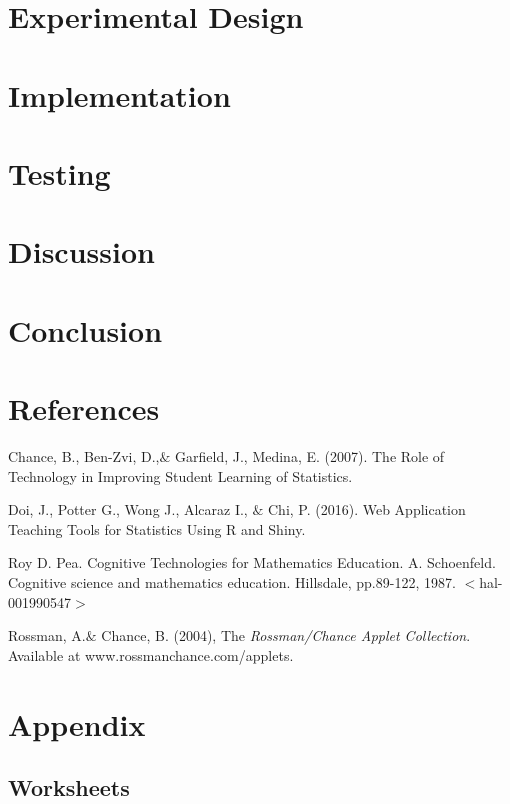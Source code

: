 \documentclass[11pt]{book}
\begin{document}
\section{Experimental Design}
\section{Implementation}
\section{Testing}


\section{Discussion}
\section{Conclusion}
\section{References}


 \begin{thebibliography}{1}

  Chance, B., Ben-Zvi, D.,$\&$ Garfield, J.,  Medina, E. (2007). The Role of Technology in Improving Student Learning of Statistics.

  Doi, J., Potter G., Wong J., Alcaraz I., $\&$ Chi, P. (2016). Web Application Teaching Tools for Statistics Using R and Shiny. 

 Roy D. Pea. Cognitive Technologies for Mathematics Education. A. Schoenfeld. Cognitive science and mathematics education. Hillsdale, pp.89-122, 1987. $<$hal-001990547$>$

 Rossman, A.$\&$ Chance, B. (2004), The \emph{Rossman/Chance Applet Collection}. Available at www.rossmanchance.com/applets.


  \end{thebibliography}

\section{Appendix}

\subsection{Worksheets}


\end{document}

